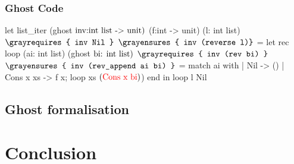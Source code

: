 \begin{frame}[fragile]
\frametitle{Ghost Code}
\begin{footnotesize}
\begin{whycode}
let list_iter (ghost $\textcolor{black}{\text{inv:int list -> unit}})$ 
    (f:int -> unit) (l: int list)
     ${\gray\texttt{requires \{ inv Nil \}}}$
     ${\gray\texttt{ensures \{ inv (reverse l)\}}}$    
 = let rec loop (ai: int list) (ghost$\textcolor{black}{\text{ bi: int list}})$
      ${\gray\texttt{requires \{ inv (rev bi) \} }}$
      ${\gray\texttt{ensures  \{ inv (rev\_append ai bi) \}}}$  
    = match ai with 
       | Nil       -> ()
       | Cons x xs -> f x; loop xs $(\textcolor{red}{\text{Cons x bi}})$) end
   in loop l Nil
\end{whycode}
\end{footnotesize}
\end{frame}

\subsection*{Ghost formalisation}

\section*{Conclusion}

	


